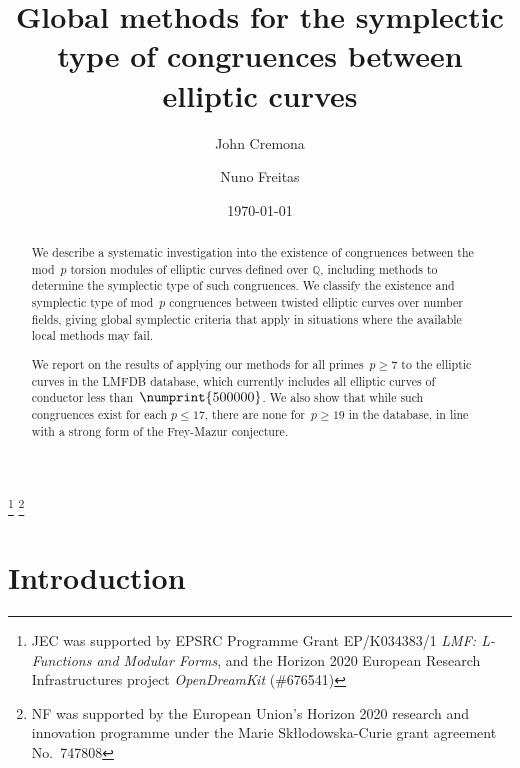 \documentclass[12pt, reqno]{amsart}
\newcommand{\Q}{\mathbb{Q}}
\numberwithin{equation}{section}
\theoremstyle{definition}
\theoremstyle{remark}
\begin{document}
\title{Global methods for the symplectic type of congruences between elliptic curves} %

\author{John Cremona}
\address{Mathematics Institute,
         University of Warwick,
         Coventry CV4 7AL,
         United Kingdom}

\author{Nuno Freitas}
\address{Departament de Matem\`atiques i Inform\`atica,
Universitat de Barcelona (UB),
Gran Via de les Corts Catalanes 585,
08007 Barcelona, Spain}


\date{\today}


\thanks{JEC was supported by EPSRC Programme Grant EP/K034383/1
  \textit{LMF: L-Functions and Modular Forms}, and the Horizon 2020
  European Research Infrastructures project \textit{OpenDreamKit}
  (\#676541)}
\thanks{NF was supported by the European Union's
  Horizon 2020 research and innovation programme under the Marie
  Sk\l{l}odowska-Curie grant agreement No.\ 747808}


\begin{abstract}
We describe a systematic investigation into the existence of
congruences between the mod~$p$ torsion modules of elliptic curves
defined over $\Q$, including methods to determine the symplectic type
of such congruences. We classify the existence and symplectic type of mod~$p$ congruences between twisted elliptic curves over number fields, giving global symplectic criteria that apply in situations where the available local methods may fail.

We report on the results of applying our methods for
all primes~$p\ge7$
to the elliptic curves in the LMFDB database, which currently includes
all elliptic curves of conductor less than~$\numprint{500000}$.  We also show that while such congruences exist
for each $p\le17$, there are none for~$p \geq 19$ in the database, in line
with a strong form of the Frey-Mazur conjecture.
\end{abstract}

\maketitle


\section{Introduction}
\end{document}
